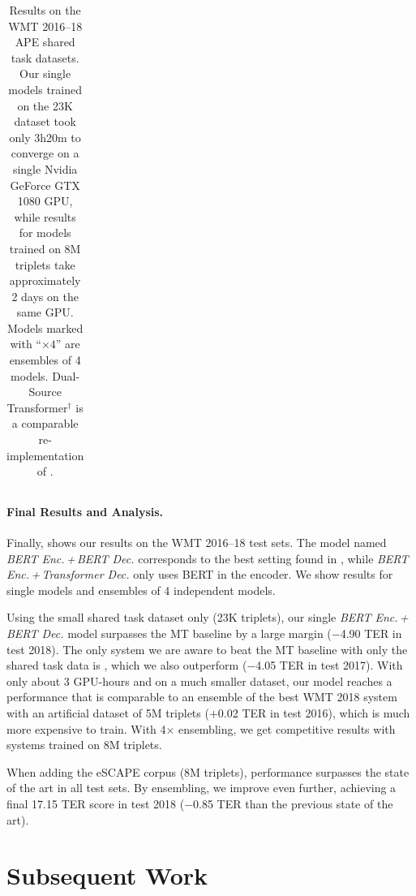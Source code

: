 \begin{landscape}
\begin{table}[t]
\begin{tabular}{lccccccc}
            \bottomrule
        \end{tabular}
        \caption{Results on the WMT 2016--18 APE shared task datasets. Our
            single models trained on the 23K dataset took only 3h20m to converge
            on a single Nvidia GeForce GTX 1080 GPU, while results for models
            trained on 8M triplets take approximately 2 days on the same GPU.
            Models marked with ``$\times 4$'' are ensembles of 4 models.
            Dual-Source Transformer$^\dagger$ is a comparable re-implementation
            of \citet{junczys2018ms}.}
        \label{tab:results_smt}
    \end{table}
\end{landscape}

\paragraph*{Final Results and Analysis.}
Finally,  shows our results on the WMT
2016--18 test sets. The model named \emph{BERT Enc.\,+\,BERT Dec.}
corresponds to the best setting found in
, while \emph{BERT Enc.\,+\,Transformer
    Dec.} only uses BERT in the encoder. We show results for single
models and ensembles of 4 independent models.

Using the small shared task dataset only (23K triplets), our single
\emph{BERT Enc.\,+\,BERT Dec.} model surpasses the MT baseline by a
large margin ($-$4.90 TER in test 2018). The only system we are aware
to beat the MT baseline with only the shared task data is
\citet{berard2017lig}, which we also outperform ($-$4.05 TER in test
2017). With only about 3 GPU-hours and on a much smaller dataset, our
model reaches a performance that is comparable to an ensemble of the
best WMT 2018 system with an artificial dataset of 5M triplets
($+$0.02 TER in test 2016), which is much more expensive to train.
With 4$\times$ ensembling, we get competitive results with systems
trained on 8M triplets.

When adding the eSCAPE corpus (8M triplets), performance surpasses
the state of the art in all test sets. By ensembling, we improve even
further, achieving a final 17.15 TER score in test 2018 ($-$0.85 TER
than the previous state of the art).

\section{Subsequent Work}

